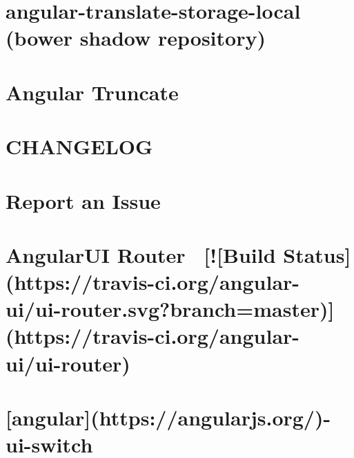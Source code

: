 \documentclass[twoside]{book}
\newcommand{\+}{\discretionary{\mbox{\scriptsize$\hookleftarrow$}}{}{}}
\begin{document}
\chapter{angular-\/translate-\/storage-\/local (bower shadow repository)}
\label{md_app_web_bower_components_angular-translate-storage-local__r_e_a_d_m_e}

\chapter{Angular Truncate}
\label{md_app_web_bower_components_angular-truncate__r_e_a_d_m_e}

\chapter{C\+H\+A\+N\+G\+E\+L\+OG}
\label{md_app_web_bower_components_angular-ui-router__c_h_a_n_g_e_l_o_g}

\chapter{Report an Issue}
\label{md_app_web_bower_components_angular-ui-router__c_o_n_t_r_i_b_u_t_i_n_g}

\chapter{Angular\+UI Router ~\mbox{[}!\mbox{[}Build Status\mbox{]}(https\+://travis-\/ci.org/angular-\/ui/ui-\/router.svg?branch=master)\mbox{]}(https\+://travis-\/ci.org/angular-\/ui/ui-\/router)}
\label{md_app_web_bower_components_angular-ui-router__r_e_a_d_m_e}

\chapter{\mbox{[}angular\mbox{]}(https\+://angularjs.org/)-\/ui-\/switch}
\label{md_app_web_bower_components_angular-ui-switch__r_e_a_d_m_e}

\end{document}
